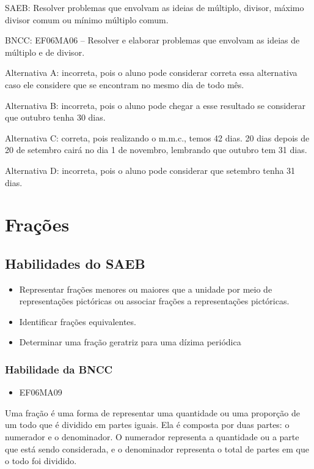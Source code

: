 SAEB: Resolver problemas que envolvam as ideias de múltiplo, divisor,
máximo divisor comum ou mínimo múltiplo comum.

BNCC: EF06MA06 -- Resolver e elaborar problemas que envolvam as ideias
de múltiplo e de divisor.

Alternativa A: incorreta, pois o aluno pode considerar correta essa
alternativa caso ele considere que se encontram no mesmo dia de todo
mês.

Alternativa B: incorreta, pois o aluno pode chegar a esse resultado se
considerar que outubro tenha 30 dias.

Alternativa C: correta, pois realizando o m.m.c., temos 42 dias. 20 dias
depois de 20 de setembro cairá no dia 1 de novembro, lembrando que
outubro tem 31 dias.

Alternativa D: incorreta, pois o aluno pode considerar que setembro
tenha 31 dias.

\chapter{Frações}

\section{Habilidades do SAEB}

\begin{itemize}

\item
Representar frações menores ou maiores que a
unidade por meio de representações pictóricas ou associar frações a
representações pictóricas.

\item
  Identificar frações equivalentes.
\item
  Determinar uma fração geratriz para uma dízima periódica

\end{itemize}

\subsection{Habilidade da BNCC} 

\begin{itemize}

\item EF06MA09

\end{itemize}


Uma fração é uma forma de representar uma quantidade ou uma proporção de
um todo que é dividido em partes iguais. Ela é composta por duas partes:
o numerador e o denominador. O numerador representa a quantidade ou a
parte que está sendo considerada, e o denominador representa o total de
partes em que o todo foi dividido.

